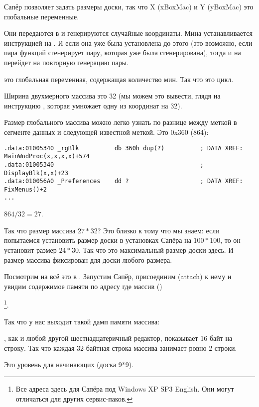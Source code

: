 Сапёр позволяет задать размеры доски, так что X (xBoxMac) и Y (yBoxMac) это глобальные переменные.

Они передаются в  и генерируются случайные координаты.
Мина устанавливается инструкцией  на . 
И если она уже была установлена до этого 
(это возможно, если пара функций  
сгенерирует пару, которая уже была сгенерирована), 
тогда  и  на  
перейдет на повторную генерацию пары.

 это глобальная переменная, содержащая количество мин. Так что это цикл.

Ширина двухмерного массива это 32 (мы можем это вывести, глядя на инструкцию , которая умножает
одну из координат на 32).

Размер глобального массива  
можно легко узнать по разнице между меткой  
в сегменте данных и следующей известной меткой. 
Это 0x360 (864):

\begin{lstlisting}[style=customasmx86]
.data:01005340 _rgBlk          db 360h dup(?)          ; DATA XREF: MainWndProc(x,x,x,x)+574
.data:01005340                                         ; DisplayBlk(x,x)+23
.data:010056A0 _Preferences    dd ?                    ; DATA XREF: FixMenus()+2
...
\end{lstlisting}

$864/32=27$.

Так что размер массива $27*32$?
Это близко к тому что мы знаем: если попытаемся установить размер доски в установках Сапёра на $100*100$, то он установит размер $24*30$.
Так что это максимальный размер доски здесь.
И размер массива фиксирован для доски любого размера.

Посмотрим на всё это в \olly.
Запустим Сапёр, присоединим (attach) \olly к нему и увидим содержимое памяти по адресу где массив  ()%

\footnote{Все адреса здесь для Сапёра под Windows XP SP3 English. 
Они могут отличаться для других сервис-паков.}.

Так что у нас выходит такой дамп памяти массива:



\olly, как и любой другой шестнадцатеричный редактор, показывает 16 байт на строку.
Так что каждая 32-байтная строка массива занимает ровно 2 строки.

Это уровень для начинающих (доска 9*9).


